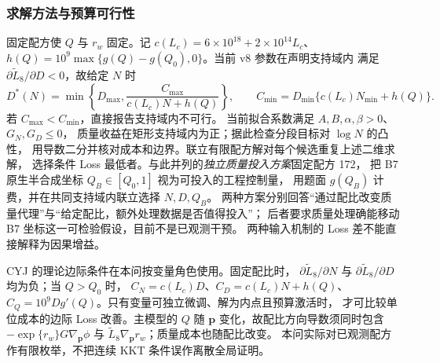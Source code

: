 \subsubsection{求解方法与预算可行性}
固定配方使 $Q$ 与 $r_w$ 固定。记
$c(L_c)=6\times10^{18}+2\times10^{14}L_c$、
$h(Q)=10^9\max\{g(Q)-g(Q_0),0\}$。当前 v8 参数在声明支持域内
满足 $\partial\widetilde L_8/\partial D<0$，故给定 $N$ 时
\begin{equation}
D^*(N)=\min\left\{D_{\max},\frac{C_{\max}}{c(L_c)N+h(Q)}\right\},
\qquad
C_{\min}=D_{\min}\{c(L_c)N_{\min}+h(Q)\}.
\label{eq:q3_v8_reduction}
\end{equation}
若 $C_{\max}<C_{\min}$，直接报告支持域内不可行。
当前拟合系数满足 $A,B,\alpha,\beta>0$、$G_N,G_D\le0$，
质量收益在矩形支持域内为正；据此检查分段目标对 $\log N$ 的凸性，
用导数二分并核对成本和边界。联立有限配方解对每个候选重复上述二维求解，
选择条件 Loss 最低者。与此并列的\emph{独立质量投入方案}固定配方 172，
把 B7 原生半合成坐标 $Q_B\in[Q_0,1]$ 视为可投入的工程控制量，
用题面 $g(Q_B)$ 计费，并在共同支持域内联立选择 $N,D,Q_B$。
两种方案分别回答“通过配比改变质量代理”与“给定配比，额外处理数据是否值得投入”；
后者要求质量处理确能移动 B7 坐标这一可检验假设，目前不是已观测干预。
两种输入机制的 Loss 差不能直接解释为因果增益。

CYJ 的理论边际条件在本问按变量角色使用。固定配比时，
$\partial\widetilde L_8/\partial N$ 与
$\partial\widetilde L_8/\partial D$ 均为负；当 $Q>Q_0$ 时，
$C_N=c(L_c)D$、$C_D=c(L_c)N+h(Q)$、
$C_Q=10^9Dg'(Q)$。只有变量可独立微调、解为内点且预算激活时，
才可比较单位成本的边际 Loss 改善。主模型的 $Q$ 随 $\boldsymbol p$
变化，故配比方向导数须同时包含
$-\exp\{r_w\}G\nabla_{\boldsymbol p}\phi$ 与
$\widetilde L_8\nabla_{\boldsymbol p}r_w$；质量成本也随配比改变。
本问实际对已观测配方作有限枚举，不把连续 KKT 条件误作离散全局证明。


